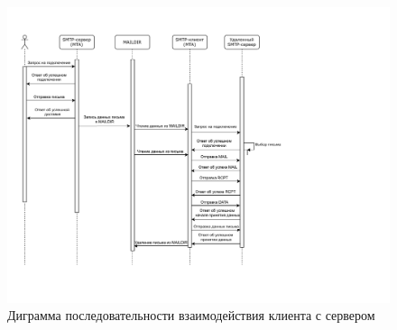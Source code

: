 \documentclass[a4paper,12pt]{report}
\begin{document}
	\begin{figure}[H]
		\centering
		\includegraphics[width=1.5\textwidth]{./resource/diagram_seq.pdf}
		\caption{Диграмма последовательности взаимодействия клиента с сервером} 
		\label{fig:EventLoopSequence}
	\end{figure}
\end{document}
